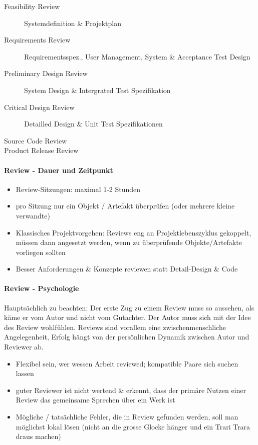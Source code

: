 \documentclass[a4paper]{article}
\begin{document}
					\begin{description}
						\item[Feasibility Review] Systemdefinition \& Projektplan
						\item[Requirements Review] Requirementsspez., User Management, System \& Acceptance Test Design
						\item[Preliminary Design Review] System Design \& Intergrated Test Spezifikation
						\item[Critical Design Review] Detailled Design \& Unit Test Spezifikationen
						\item[Source Code Review] 
						\item[Product Release Review]
					\end{description}
				
\newpage
				
				\paragraph{Review - Dauer und Zeitpunkt}
				
					\begin{itemize}
						\item Review-Sitzungen: maximal 1-2 Stunden
						\item pro Sitzung nur ein Objekt / Artefakt überprüfen (oder mehrere kleine verwandte)
						\item Klassisches Projektvorgehen: Reviews eng an Projektlebenszyklus gekoppelt, müssen dann angesetzt werden, wenn zu überprüfende Objekte/Artefakte vorliegen sollten
						\item Besser Anforderungen \& Konzepte reviewen statt Detail-Design \& Code
					\end{itemize}
	
				\paragraph{Review - Psychologie}
				
				Hauptsächlich zu beachten:
				Der erste Zug zu einem Review muss so aussehen, als käme er vom Autor und nicht vom Gutachter.
				Der Autor muss sich mit der Idee des Review wohlfühlen.
				Reviews sind vorallem eine zwischenmenschliche Angelegenheit, Erfolg hängt von der persönlichen Dynamik zwischen Autor und Reviewer ab.
				
				\begin{itemize}
					\item Flexibel sein, wer wessen Arbeit reviewed; kompatible Paare sich suchen lassen
					\item guter Reviewer ist nicht wertend \& erkennt, dass der primäre Nutzen einer Review das gemeinsame Sprechen über ein Werk ist
					\item Mögliche / tatsächliche Fehler, die in Review gefunden werden, soll man möglichst lokal lösen (nicht an die grosse Glocke hänger und ein Trari Trara draus machen)
				\end{itemize}
	
\end{document}
